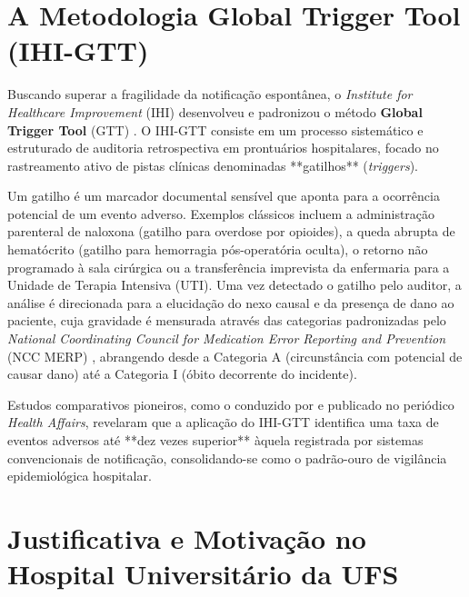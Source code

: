 \section{A Metodologia Global Trigger Tool (IHI-GTT)}
\label{sec_metodologia_gtt_intro}

Buscando superar a fragilidade da notificação espontânea, o \textit{Institute for Healthcare Improvement} (IHI) desenvolveu e padronizou o método \textbf{Global Trigger Tool} (GTT) \cite{griffin2009ihi}. O IHI-GTT consiste em um processo sistemático e estruturado de auditoria retrospectiva em prontuários hospitalares, focado no rastreamento ativo de pistas clínicas denominadas **gatilhos** (\textit{triggers}). 

Um gatilho é um marcador documental sensível que aponta para a ocorrência potencial de um evento adverso. Exemplos clássicos incluem a administração parenteral de naloxona (gatilho para overdose por opioides), a queda abrupta de hematócrito (gatilho para hemorragia pós-operatória oculta), o retorno não programado à sala cirúrgica ou a transferência imprevista da enfermaria para a Unidade de Terapia Intensiva (UTI). Uma vez detectado o gatilho pelo auditor, a análise é direcionada para a elucidação do nexo causal e da presença de dano ao paciente, cuja gravidade é mensurada através das categorias padronizadas pelo \textit{National Coordinating Council for Medication Error Reporting and Prevention} (NCC MERP) \cite{nccmerp2001}, abrangendo desde a Categoria A (circunstância com potencial de causar dano) até a Categoria I (óbito decorrente do incidente).

Estudos comparativos pioneiros, como o conduzido por  e publicado no periódico \textit{Health Affairs}, revelaram que a aplicação do IHI-GTT identifica uma taxa de eventos adversos até **dez vezes superior** àquela registrada por sistemas convencionais de notificação, consolidando-se como o padrão-ouro de vigilância epidemiológica hospitalar.

\section{Justificativa e Motivação no Hospital Universitário da UFS}
\label{sec_justificativa}

